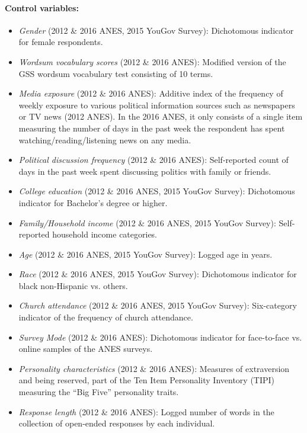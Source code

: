 \paragraph{Control variables:}
\begin{itemize}
\item \textit{Gender} (2012 \& 2016 ANES, 2015 YouGov Survey): Dichotomous indicator for female respondents.
\item \textit{Wordsum vocabulary scores}  (2012 \& 2016 ANES): Modified version of the GSS wordsum vocabulary test consisting of 10 terms.
\item \textit{Media exposure} (2012 \& 2016 ANES): Additive index of the frequency of weekly exposure to various political information sources such as newspapers or TV news (2012 ANES). In the 2016 ANES, it only consists of a single item measuring the number of days in the past week the respondent has spent watching/reading/listening news on any media.
\item \textit{Political discussion frequency} (2012 \& 2016 ANES): Self-reported count of days in the past week spent discussing politics with family or friends.
\item \textit{College education} (2012 \& 2016 ANES, 2015 YouGov Survey): Dichotomous indicator for Bachelor's degree or higher.
\item \textit{Family/Household income} (2012 \& 2016 ANES, 2015 YouGov Survey): Self-reported household income categories.
\item \textit{Age} (2012 \& 2016 ANES, 2015 YouGov Survey): Logged age in years.
\item \textit{Race} (2012 \& 2016 ANES, 2015 YouGov Survey): Dichotomous indicator for black non-Hispanic vs. others.
\item \textit{Church attendance} (2012 \& 2016 ANES, 2015 YouGov Survey): Six-category indicator of the frequency of church attendance. 
\item \textit{Survey Mode} (2012 \& 2016 ANES): Dichotomous indicator for face-to-face vs. online samples of the ANES surveys.
\item \textit{Personality characteristics} (2012 \& 2016 ANES): Measures of extraversion and being reserved, part of the Ten Item Personality Inventory (TIPI) measuring the ``Big Five'' personality traits.
\item \textit{Response length} (2012 \& 2016 ANES): Logged number of words in the collection of open-ended responses by each individual.
\end{itemize}


